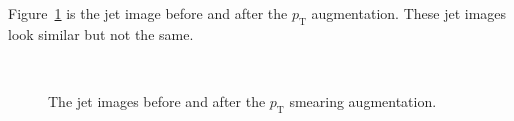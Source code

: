 \documentclass[12pt]{article}
\begin{document}
        Figure~\ref{fig:pt_smearing_jet_constituent_jet_image} is the jet image before and after the $p_{\text{T}}$ augmentation. These jet images look similar but not the same.
        \begin{figure}[htpb]
            \centering
             \\
            \caption{The jet images before and after the $p_{\text{T}}$ smearing augmentation.}
            \label{fig:pt_smearing_jet_constituent_jet_image}
        \end{figure}
\end{document}
